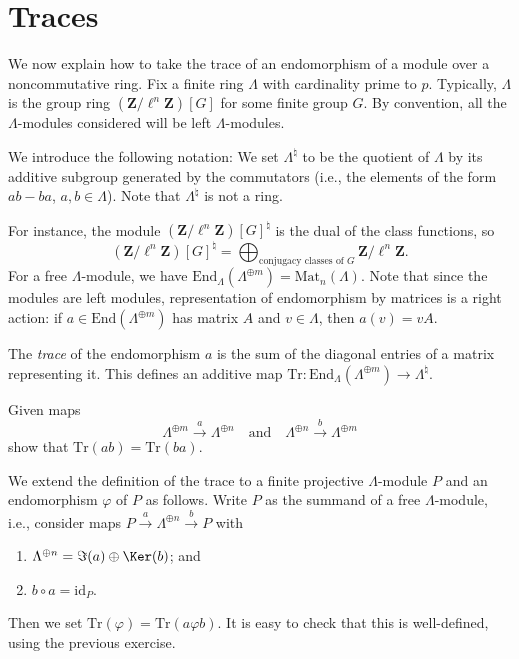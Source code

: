 \section{Traces}
\label{section-traces}

\noindent
We now explain how to take the trace of an endomorphism of a module over a
noncommutative ring. Fix a finite ring $\Lambda$ with cardinality prime to $p$.
Typically, $\Lambda$ is the group ring $(\mathbf{Z}/\ell^n\mathbf{Z})[G]$ for
some finite group $G$. By convention, all the $\Lambda$-modules considered will
be left $\Lambda$-modules.

\medskip\noindent
We introduce the following notation:
We set $\Lambda^\natural$ to be the quotient of $\Lambda$ by its additive
subgroup generated by the commutators (i.e., the elements of the form
$ab-ba$, $a, b \in \Lambda$). Note that $\Lambda^\natural$ is not a ring.

\medskip\noindent
For instance, the module $(\mathbf{Z}/\ell^n\mathbf{Z})[G]^\natural$ is the
dual of the class functions, so
$$
(\mathbf{Z}/\ell^n\mathbf{Z})[G]^\natural
=
\bigoplus\nolimits_{\text{conjugacy classes of }G}
\mathbf{Z}/\ell^n\mathbf{Z}.
$$
For a free $\Lambda$-module, we have $\text{End}_\Lambda(\Lambda^{\oplus m}) =
\text{Mat}_n(\Lambda)$. Note that since the modules are left modules,
representation of endomorphism by matrices is a right action: if $a \in
\text{End}(\Lambda^{\oplus m})$ has matrix $A$ and $v \in \Lambda$, then $a(v)
= v A$.

\begin{definition}
\label{definition-trace}
The {\it trace} of the endomorphism $a$ is the sum of the diagonal entries of
a matrix representing it. This defines an additive map $\text{Tr} :
\text{End}_\Lambda(\Lambda^{\oplus m}) \to \Lambda^\natural$.
\end{definition}

\begin{exercise}
\label{exercise-trace-is-trace}
Given maps
$$
\Lambda^{\oplus m} \xrightarrow{a} \Lambda^{\oplus n}
\quad\text{and}\quad
\Lambda^{\oplus n} \xrightarrow{b} \Lambda^{\oplus m}
$$
show that $\text{Tr}(ab) = \text{Tr}(ba)$.
\end{exercise}

\noindent
We extend the definition of the trace to a finite projective $\Lambda$-module
$P$ and an endomorphism $\varphi$ of $P$ as follows. Write $P$ as the summand
of a free $\Lambda$-module, i.e., consider maps $P \xrightarrow{a}
\Lambda^{\oplus n} \xrightarrow{b} P$ with
\begin{enumerate}
\item
$\Lambda^{\oplus n} = \Im(a) \oplus \Ker(b)$; and
\item
$b\circ a = \text{id}_P$.
\end{enumerate}
Then we set $\text{Tr}(\varphi) = \text{Tr}(a\varphi b)$. It is easy to check
that this is well-defined, using the previous exercise.








